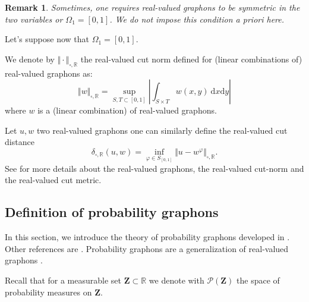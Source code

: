 \documentclass[11pt]{article}
\newtheorem{remark}[theorem]{Remark}
\def\R{\mathbb{R}}
\newcommand{\Space}{\mathbf{Z}}
\newcommand{\InvRelabel}{S_{[0,1]}}
\newcommand{\NcutR}[1]{\Vert#1\Vert_{\square,\R}}
\newcommand{\NcutRSymbol}{\Vert\cdot\Vert_{\square,\R}}
\newcommand{\drv}{\mathrm{d}}
\begin{document}
\begin{remark}
Sometimes, one requires real-valued graphons to be symmetric in the two variables or $\Omega_1=[0,1]$. We do not impose this condition a priori here. 
\end{remark}

Let's suppose now that $\Omega_1=[0,1].$

We denote by $\NcutRSymbol$ the real-valued cut norm defined for (linear combinations of) real-valued graphons as:
\begin{equation}
	\label{eq_def_NcutR}
\NcutR{w} = \sup_{S,T \subset [0,1]} \left\vert \int_{S\times T} w(x,y)\ \drv x\drv y \right\vert
\end{equation}
where $w$ is a (linear combination) of real-valued graphons. 

Let $u,w$ two real-valued graphons one can similarly define the real-valued cut distance %
$$\delta_{\square,\R}(u,w)=\inf_{\varphi\in \InvRelabel}\NcutR{u-w^{\varphi}}.$$
See \cite{LovaszGraphLimits} for more details about the real-valued graphons, the real-valued cut-norm and the real-valued cut metric.

\subsection{Definition of probability graphons}\label{section_def_graphons}

In this section, we introduce the theory of probability graphons developed in \cite{abraham2023probabilitygraphons}. Other references are \cite{zucal2024probabilitygraphonsrightconvergence,KUNSZENTIKOVACS2022109284,lovász2010limits}. Probability graphons are a generalization of real-valued graphons \cite{LovaszGraphLimits,LOVASZ2006933,BORGS20081801,borgs2011convergentAnnals}.

Recall that for a measurable set $\Space\subset \R$ we denote with $\mathcal{P}(\Space)$ the space of probability measures on $\Space$.
\end{document}
